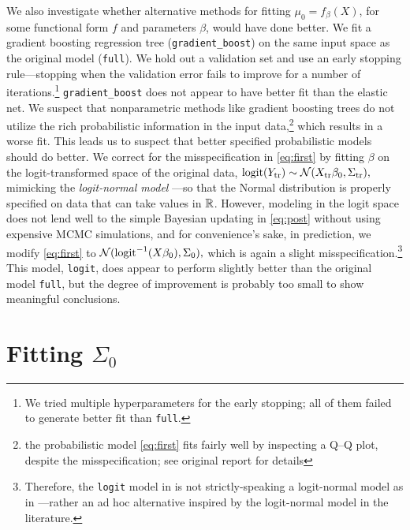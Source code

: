 \documentclass[12pt]{article}
\newcommand{\logit}{\operatorname{logit}}
\begin{document}
We also investigate whether alternative methods for fitting $\mu_0 =
f_\beta(X)$, for some functional form $f$ and parameters $\beta$, would have
done better. We fit a gradient boosting regression tree
(\texttt{gradient\_boost}) on the same input space as the original model
(\texttt{full}). We hold out a validation set and use an early stopping
rule---stopping when the validation error fails to improve for a number of
iterations.\footnote{We tried multiple hyperparameters for the early stopping;
all of them failed to generate better fit than \texttt{full}.}
\texttt{gradient\_boost} does not appear to have better fit than the elastic
net. We suspect that nonparametric methods like gradient boosting trees do not
utilize the rich probabilistic information in the input data,\footnote{the probabilistic
model \eqref{eq:first} fits fairly well by inspecting a Q--Q plot, despite the misspecification; see original
report for details} which results in a worse fit. This leads us to suspect that
better specified probabilistic models should do better. We correct for the
misspecification in \eqref{eq:first} by fitting $\beta$ on the logit-transformed
space of the original data, $
\logit(Y_\text{tr}) \sim \Norm(X_\text{tr}\beta_0, \Sigma_\text{tr}),
$
mimicking the \emph{logit-normal model} \cite[page 283]{agresti2015foundations}---so that the Normal distribution is properly specified on data that can take values in $\mathbb{R}$. However, modeling in the logit space does not lend well to the simple Bayesian updating in \eqref{eq:post} without using expensive MCMC simulations, and for convenience's sake, in prediction, we modify \eqref{eq:first} to $\Norm(\logit^{-1}(X\beta_0), \Sigma_0),$ which is again a slight misspecification.\footnote{Therefore, the \texttt{logit} model in  is not strictly-speaking a logit-normal model as in \cite{agresti2015foundations}---rather an ad hoc alternative inspired by the logit-normal model in the literature.} This model, \texttt{logit}, does appear to perform slightly better than the original model \texttt{full}, but the degree of improvement is probably too small to show meaningful conclusions.  


\section{Fitting $\Sigma_0$}
\label{sec:sigma}
\end{document}
